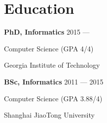 \section{Education}
\parbox[t][][t]{\linewidth}{
	\parbox{\linewidth}{\textbf{PhD, Informatics} \hfill {{2015 --- }}}
	\parbox{\linewidth}{{Computer Science (GPA 4/4)}}
	\parbox{\linewidth}{{Georgia Institute of Technology}}
	\smallskip
}


\parbox[t][][t]{\linewidth}{
	\parbox{\linewidth}{\textbf{BSc, Informatics} \hfill {{2011 --- 2015}}}
	\parbox{\linewidth}{{Computer Science (GPA 3.88/4)}}
	\parbox{\linewidth}{{Shanghai JiaoTong University}}
	\smallskip
}


